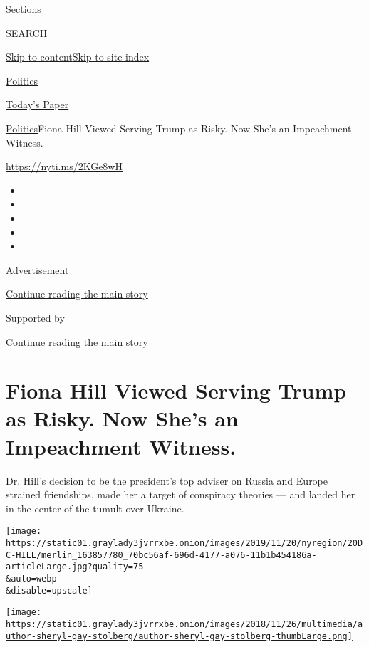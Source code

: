 Sections

SEARCH

\protect\hyperlink{site-content}{Skip to
content}\protect\hyperlink{site-index}{Skip to site index}

\href{https://www.nytimes3xbfgragh.onion/section/politics}{Politics}

\href{https://myaccount.nytimes3xbfgragh.onion/auth/login?response_type=cookie\&client_id=vi}{}

\href{https://www.nytimes3xbfgragh.onion/section/todayspaper}{Today's
Paper}

\href{/section/politics}{Politics}\textbar{}Fiona Hill Viewed Serving
Trump as Risky. Now She's an Impeachment Witness.

\url{https://nyti.ms/2KGe8wH}

\begin{itemize}
\item
\item
\item
\item
\item
\end{itemize}

Advertisement

\protect\hyperlink{after-top}{Continue reading the main story}

Supported by

\protect\hyperlink{after-sponsor}{Continue reading the main story}

\hypertarget{fiona-hill-viewed-serving-trump-as-risky-now-shes-an-impeachment-witness}{%
\section{Fiona Hill Viewed Serving Trump as Risky. Now She's an
Impeachment
Witness.}\label{fiona-hill-viewed-serving-trump-as-risky-now-shes-an-impeachment-witness}}

Dr. Hill's decision to be the president's top adviser on Russia and
Europe strained friendships, made her a target of conspiracy theories
--- and landed her in the center of the tumult over Ukraine.

\texttt{[image: https://static01.graylady3jvrrxbe.onion/images/2019/11/20/nyregion/20DC-HILL/merlin\_163857780\_70bc56af-696d-4177-a076-11b1b454186a-articleLarge.jpg?quality=75\\\&auto=webp\\\&disable=upscale]}

\href{https://www.nytimes3xbfgragh.onion/by/sheryl-gay-stolberg}{\texttt{[image: https://static01.graylady3jvrrxbe.onion/images/2018/11/26/multimedia/author-sheryl-gay-stolberg/author-sheryl-gay-stolberg-thumbLarge.png]}}

